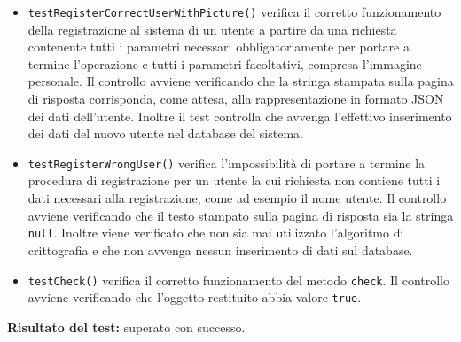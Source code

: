 \begin{itemize}
\begin{itemize}
\item \texttt{testRegisterCorrectUserWithPicture()}
verifica il corretto funzionamento della registrazione al sistema di un utente a partire da una richiesta contenente tutti i parametri necessari obbligatoriamente per portare a termine l'operazione e tutti i parametri facoltativi, compresa l'immagine personale. 
Il controllo avviene verificando che la stringa stampata sulla pagina di risposta corrisponda, come attesa, alla rappresentazione in formato JSON dei dati dell'utente. Inoltre il test controlla che avvenga l'effettivo inserimento dei dati del nuovo utente nel database del sistema.

\item \texttt{testRegisterWrongUser()} 
verifica l'impossibilità di portare a termine la procedura di registrazione per un utente la cui richiesta non contiene tutti i dati necessari alla registrazione, come ad esempio il nome utente. Il controllo avviene verificando che il testo stampato sulla pagina di risposta sia la stringa \texttt{null}. Inoltre viene verificato che non sia mai utilizzato l'algoritmo di crittografia e che non avvenga nessun inserimento di dati sul database.

\item \texttt{testCheck()} verifica il corretto funzionamento del metodo \texttt{check}. Il controllo avviene verificando che l'oggetto restituito abbia valore \texttt{true}.
 
\end{itemize}

\textbf{Risultato del test:} superato con successo.

\end{itemize}

